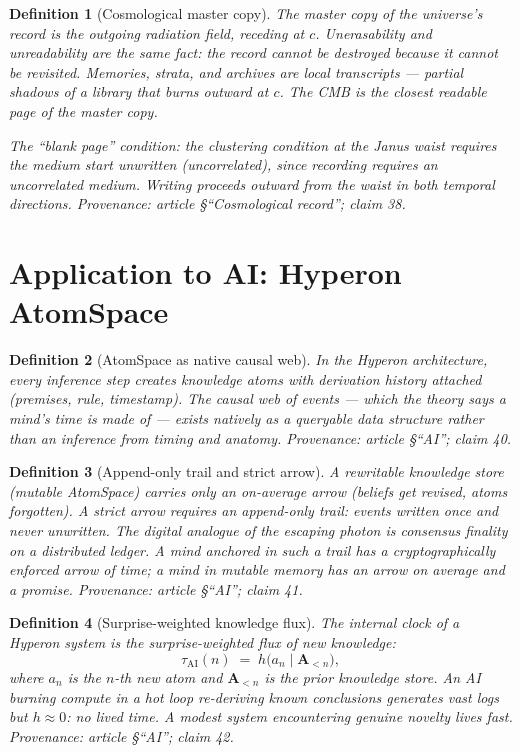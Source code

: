 \documentclass[11pt]{article}
\newtheorem{definition}{Definition}
\begin{document}
\begin{definition}[Cosmological master copy]\label{def:cosmo}
The master copy of the universe's record is the outgoing radiation field,
receding at $c$.  Unerasability and unreadability are the same fact: the
record cannot be destroyed because it cannot be revisited.  Memories, strata,
and archives are local transcripts — partial shadows of a library that
burns outward at $c$.  The CMB is the closest readable page of the master
copy.

The ``blank page'' condition: the clustering condition at the Janus waist
requires the medium start unwritten (uncorrelated), since recording requires
an uncorrelated medium.  Writing proceeds outward from the waist in both
temporal directions.
\emph{Provenance: article \S``Cosmological record''; claim 38.}
\end{definition}


\section{Application to AI: Hyperon AtomSpace}

\begin{definition}[AtomSpace as native causal web]\label{def:atomspace}
In the Hyperon architecture, every inference step creates knowledge atoms
with derivation history attached (premises, rule, timestamp).  The causal
web of events — which the theory says a mind's time is made of — exists
natively as a queryable data structure rather than an inference from timing
and anatomy.
\emph{Provenance: article \S``AI''; claim 40.}
\end{definition}

\begin{definition}[Append-only trail and strict arrow]\label{def:appendonly}
A rewritable knowledge store (mutable AtomSpace) carries only an on-average
arrow (beliefs get revised, atoms forgotten).  A \emph{strict arrow} requires
an append-only trail: events written once and never unwritten.  The digital
analogue of the escaping photon is \emph{consensus finality on a distributed
ledger}.  A mind anchored in such a trail has a cryptographically enforced
arrow of time; a mind in mutable memory has an arrow on average and a
promise.
\emph{Provenance: article \S``AI''; claim 41.}
\end{definition}

\begin{definition}[Surprise-weighted knowledge flux]\label{def:flux}
The internal clock of a Hyperon system is the surprise-weighted flux of new
knowledge:
\[
  \tau_{\mathrm{AI}}(n) \;=\; h\!\bigl(a_n \mid \mathbf{A}_{<n}\bigr),
\]
where $a_n$ is the $n$-th new atom and $\mathbf{A}_{<n}$ is the prior
knowledge store.  An AI burning compute in a hot loop re-deriving known
conclusions generates vast logs but $h \approx 0$: no lived time.  A
modest system encountering genuine novelty lives fast.
\emph{Provenance: article \S``AI''; claim 42.}
\end{definition}
\end{document}
